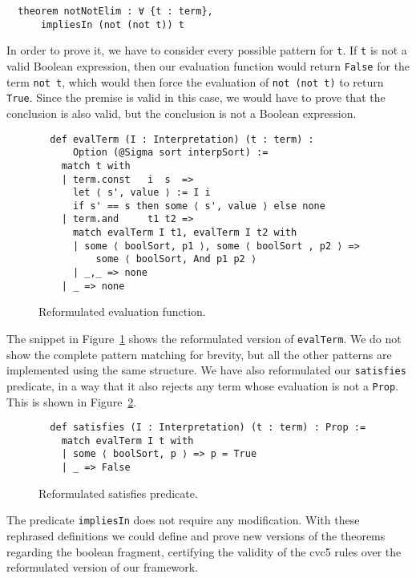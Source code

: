 \begin{verbatim}
  theorem notNotElim : ∀ {t : term},
      impliesIn (not (not t)) t
\end{verbatim}

In order to prove it, we have to consider every possible pattern for \texttt{t}.
If \texttt{t} is not a valid Boolean expression, then our evaluation function would
return \texttt{False} for the term \texttt{not t}, which would then force the
evaluation of \texttt{not (not t)} to return \texttt{True}. Since the premise
is valid in this case, we would have to prove that the conclusion is also valid,
but the conclusion is not a Boolean expression.


\begin{figure}[t]
\begin{verbatim}
  def evalTerm (I : Interpretation) (t : term) :
      Option (@Sigma sort interpSort) :=
    match t with
    | term.const   i  s  =>
      let ⟨ s', value ⟩ := I i
      if s' == s then some ⟨ s', value ⟩ else none
    | term.and     t1 t2 =>
      match evalTerm I t1, evalTerm I t2 with
      | some ⟨ boolSort, p1 ⟩, some ⟨ boolSort , p2 ⟩ =>
          some ⟨ boolSort, And p1 p2 ⟩
      | _,_ => none
    | _ => none
\end{verbatim}
\caption{Reformulated evaluation function.}\label{evalTerm2}
\end{figure}

The snippet in Figure~\ref{evalTerm2} shows the reformulated version of \texttt{evalTerm}.
We do not show the complete pattern matching for brevity, but all the other
patterns are implemented using the same structure.
We have also reformulated our \texttt{satisfies} predicate, in a way that
it also rejects any term whose evaluation is not a \texttt{Prop}. This is shown
in Figure~\ref{satisfiesPred}.

\begin{figure}[t]
\begin{verbatim}
  def satisfies (I : Interpretation) (t : term) : Prop :=
    match evalTerm I t with
    | some ⟨ boolSort, p ⟩ => p = True
    | _ => False
\end{verbatim}
\caption{Reformulated satisfies predicate.}\label{satisfiesPred}
\end{figure}

The predicate \texttt{impliesIn} does not require any modification. With these
rephrased definitions we could define and prove new versions of
the theorems regarding the boolean fragment, certifying the validity of the
cvc5 rules over the reformulated version of our framework.

